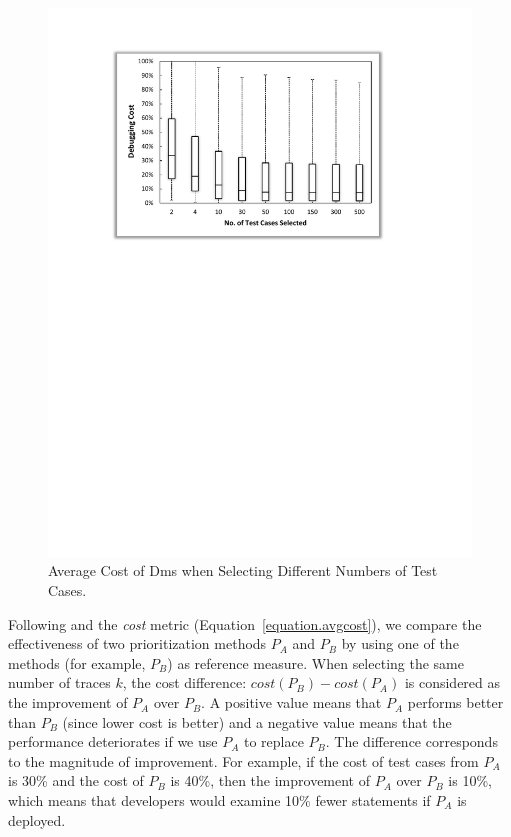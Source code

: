 \begin{figure}[!htbp]
    \centering
    \includegraphics[width=12cm]{sdm_boxplot.pdf}
    \caption{Average Cost of {\sc Dms} when Selecting Different Numbers of Test Cases.}
    \label{Dms_boxplot}
\end{figure}

Following \cite{BaahPH10,BaahPH11} and the {\em cost}
metric (Equation~\ref{equation.avgcost}), we compare
the effectiveness of two prioritization methods $P_A$ and $P_B$ by using
one of the methods (for example, $P_B$) as reference measure.
When selecting the same number of traces $k$, the cost difference:
$cost(P_B) - cost(P_A)$ is considered as the improvement of $P_A$
over $P_B$. A positive value means that $P_A$ performs better than
$P_B$ (since lower cost is better) and a negative value means that the performance deteriorates if we use $P_A$ to replace $P_B$.
The difference corresponds
to the magnitude of improvement. For example, if the cost of
test cases from $P_A$ is 30\% and the cost of $P_B$ is 40\%,
then the improvement of $P_A$ over $P_B$ is 10\%, which means
that developers would examine 10\% fewer statements if $P_A$
is deployed.

